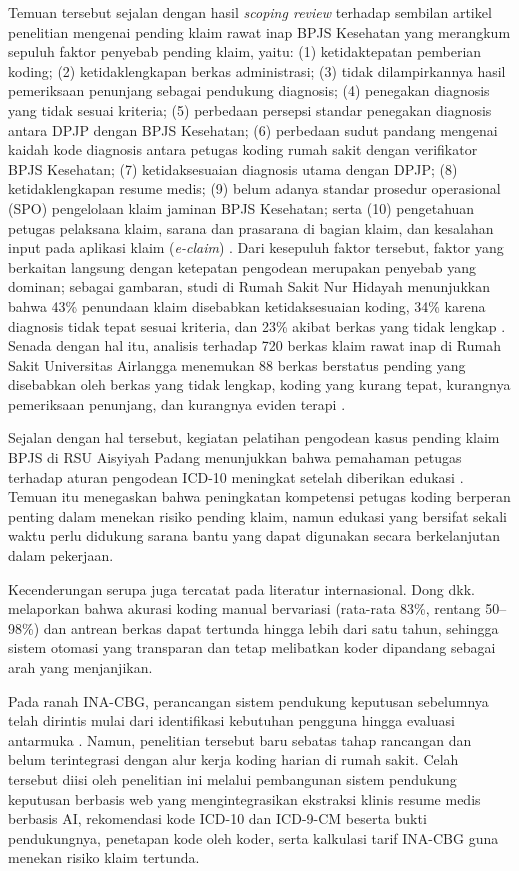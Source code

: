 Temuan tersebut sejalan dengan hasil \textit{scoping review} terhadap sembilan artikel penelitian mengenai pending klaim rawat inap BPJS Kesehatan yang merangkum sepuluh faktor penyebab pending klaim, yaitu: (1) ketidaktepatan pemberian koding; (2) ketidaklengkapan berkas administrasi; (3) tidak dilampirkannya hasil pemeriksaan penunjang sebagai pendukung diagnosis; (4) penegakan diagnosis yang tidak sesuai kriteria; (5) perbedaan persepsi standar penegakan diagnosis antara DPJP dengan BPJS Kesehatan; (6) perbedaan sudut pandang mengenai kaidah kode diagnosis antara petugas koding rumah sakit dengan verifikator BPJS Kesehatan; (7) ketidaksesuaian diagnosis utama dengan DPJP; (8) ketidaklengkapan resume medis; (9) belum adanya standar prosedur operasional (SPO) pengelolaan klaim jaminan BPJS Kesehatan; serta (10) pengetahuan petugas pelaksana klaim, sarana dan prasarana di bagian klaim, dan kesalahan input pada aplikasi klaim (\textit{e-claim}) \cite{10}. Dari kesepuluh faktor tersebut, faktor yang berkaitan langsung dengan ketepatan pengodean merupakan penyebab yang dominan; sebagai gambaran, studi di Rumah Sakit Nur Hidayah menunjukkan bahwa 43\% penundaan klaim disebabkan ketidaksesuaian koding, 34\% karena diagnosis tidak tepat sesuai kriteria, dan 23\% akibat berkas yang tidak lengkap \cite{10}. Senada dengan hal itu, analisis terhadap 720 berkas klaim rawat inap di Rumah Sakit Universitas Airlangga menemukan 88 berkas berstatus pending yang disebabkan oleh berkas yang tidak lengkap, koding yang kurang tepat, kurangnya pemeriksaan penunjang, dan kurangnya eviden terapi \cite{16}.

Sejalan dengan hal tersebut, kegiatan pelatihan pengodean kasus pending klaim BPJS di RSU Aisyiyah Padang menunjukkan bahwa pemahaman petugas terhadap aturan pengodean ICD-10 meningkat setelah diberikan edukasi \cite{15}. Temuan itu menegaskan bahwa peningkatan kompetensi petugas koding berperan penting dalam menekan risiko pending klaim, namun edukasi yang bersifat sekali waktu perlu didukung sarana bantu yang dapat digunakan secara berkelanjutan dalam pekerjaan.

Kecenderungan serupa juga tercatat pada literatur internasional. Dong dkk. \cite{6} melaporkan bahwa akurasi koding manual bervariasi (rata-rata 83\%, rentang 50--98\%) dan antrean berkas dapat tertunda hingga lebih dari satu tahun, sehingga sistem otomasi yang transparan dan tetap melibatkan koder dipandang sebagai arah yang menjanjikan.

Pada ranah INA-CBG, perancangan sistem pendukung keputusan sebelumnya telah dirintis mulai dari identifikasi kebutuhan pengguna hingga evaluasi antarmuka \cite{18}. Namun, penelitian tersebut baru sebatas tahap rancangan dan belum terintegrasi dengan alur kerja koding harian di rumah sakit. Celah tersebut diisi oleh penelitian ini melalui pembangunan sistem pendukung keputusan berbasis web yang mengintegrasikan ekstraksi klinis resume medis berbasis AI, rekomendasi kode ICD-10 dan ICD-9-CM beserta bukti pendukungnya, penetapan kode oleh koder, serta kalkulasi tarif INA-CBG guna menekan risiko klaim tertunda.

